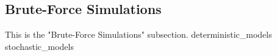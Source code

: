 \subsection{Brute-Force Simulations}

This is the "Brute-Force Simulations" subsection. 
{deterministic_models}
{stochastic_models}
